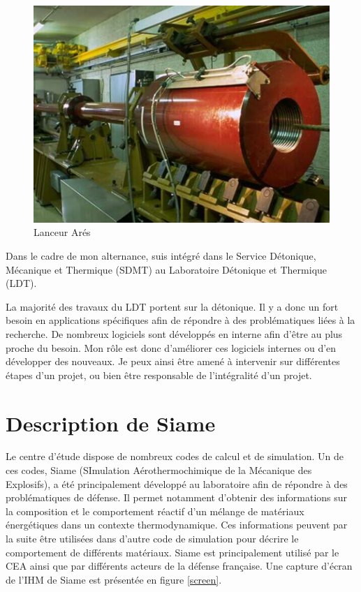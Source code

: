 \begin{figure}[h]
\centering
\includegraphics[scale=0.5]{ares.png}
\caption{Lanceur Arés} 
\label{ares}
\end{figure}

Dans le cadre de mon alternance, suis intégré dans le Service Détonique, Mécanique et Thermique (SDMT) au Laboratoire Détonique et Thermique (LDT).

La majorité des travaux du LDT portent sur la détonique. Il y a donc un fort besoin en applications spécifiques afin de répondre à des problématiques liées à la recherche. De nombreux logiciels sont développés en interne afin d'être au plus proche du besoin. Mon rôle est donc d'améliorer ces logiciels internes ou d'en développer des nouveaux. Je peux ainsi être amené à intervenir sur différentes étapes d'un projet, ou bien être responsable de l'intégralité d'un projet. 

\newpage

\section{Description de Siame}

Le centre d'étude dispose de nombreux codes de calcul et de simulation. Un de ces codes, Siame (SImulation Aérothermochimique de la Mécanique des Explosifs), a été principalement développé au laboratoire afin de répondre à des problématiques de défense. Il permet notamment d’obtenir des informations sur la composition et le comportement réactif d’un mélange de matériaux énergétiques dans un contexte thermodynamique. Ces informations peuvent par la suite être utilisées dans d’autre code de simulation pour décrire le comportement de différents matériaux. Siame est principalement utilisé par le CEA ainsi que par différents acteurs de la défense française. Une capture d’écran de l’IHM de Siame est présentée en figure \ref{screen}.

